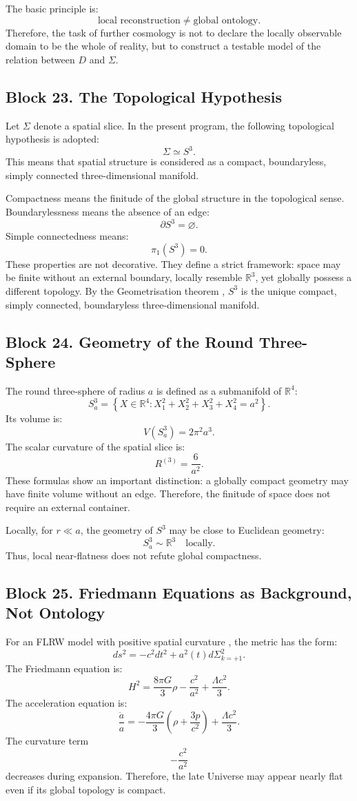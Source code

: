 \documentclass[12pt,a4paper]{article}
\theoremstyle{definition}
\begin{document}
The basic principle is:
\[
\text{local reconstruction}
\neq
\text{global ontology}.
\]
Therefore, the task of further cosmology is not to declare the locally observable domain to be the whole of reality, but to construct a testable model of the relation between \(D\) and \(\Sigma\).



\subsection{Block 23. The Topological Hypothesis}
Let \(\Sigma\) denote a spatial slice. In the present program, the following topological hypothesis is adopted:
\[
\Sigma\simeq S^3.
\]
This means that spatial structure is considered as a compact, boundaryless, simply connected three-dimensional manifold.

Compactness means the finitude of the global structure in the topological sense. Boundarylessness means the absence of an edge:
\[
\partial S^3=\varnothing.
\]
Simple connectedness means:
\[
\pi_1(S^3)=0.
\]
These properties are not decorative. They define a strict framework: space may be finite without an external boundary, locally resemble \(\mathbb R^3\), yet globally possess a different topology. By the Geometrisation theorem \cite{Perelman2003,Thurston1997}, \(S^3\) is the unique compact, simply connected, boundaryless three-dimensional manifold.



\subsection{Block 24. Geometry of the Round Three-Sphere}
The round three-sphere of radius \(a\) is defined as a submanifold of \(\mathbb R^4\):
\[
S^3_a=
\left\{
X\in\mathbb R^4:
X_1^2+X_2^2+X_3^2+X_4^2=a^2
\right\}.
\]
Its volume is:
\[
V(S^3_a)=2\pi^2a^3.
\]
The scalar curvature of the spatial slice is:
\[
R^{(3)}=\frac{6}{a^2}.
\]
These formulas show an important distinction: a globally compact geometry may have finite volume without an edge. Therefore, the finitude of space does not require an external container.

Locally, for \(r\ll a\), the geometry of \(S^3\) may be close to Euclidean geometry:
\[
S^3_a \sim \mathbb R^3
\quad
\text{locally}.
\]
Thus, local near-flatness does not refute global compactness.



\subsection{Block 25. Friedmann Equations as Background, Not Ontology}
For an FLRW model with positive spatial curvature \cite{Friedmann1922,Robertson1935,Walker1937,Wald1984}, the metric has the form:
\[
ds^2=-c^2dt^2+a^2(t)d\Sigma^2_{k=+1}.
\]
The Friedmann equation is:
\[
H^2=
\frac{8\pi G}{3}\rho
-\frac{c^2}{a^2}
+\frac{\Lambda c^2}{3}.
\]
The acceleration equation is:
\[
\frac{\ddot a}{a}
=
-\frac{4\pi G}{3}
\left(
\rho+\frac{3p}{c^2}
\right)
+\frac{\Lambda c^2}{3}.
\]
The curvature term
\[
-\frac{c^2}{a^2}
\]
decreases during expansion. Therefore, the late Universe may appear nearly flat even if its global topology is compact.
\end{document}
